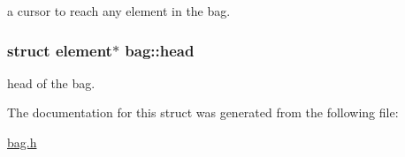 a cursor to reach any element in the bag. 

\hypertarget{structbag_a9c1cd8fc1f57914986d31ebe01091cf4}{
\subsubsection[{head}]{\setlength{\rightskip}{0pt plus 5cm}struct {\bf element}$\ast$ bag\-::head}}\label{structbag_a9c1cd8fc1f57914986d31ebe01091cf4}


head of the bag. 



The documentation for this struct was generated from the following file\-:\begin{DoxyCompactItemize}
\item 
\hyperlink{bag_8h}{bag.\-h}\end{DoxyCompactItemize}
